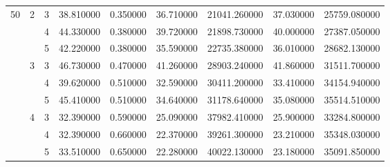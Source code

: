 \begin{tabular}{lllrrrrrr}
\cline{1-9} \cline{2-9}
\multirow[t]{9}{*}{50} & \multirow[t]{3}{*}{2} & 3 & 38.810000 & 0.350000 & 36.710000 & 21041.260000 & 37.030000 & 25759.080000 \\
 &  & 4 & 44.330000 & 0.380000 & 39.720000 & 21898.730000 & 40.000000 & 27387.050000 \\
 &  & 5 & 42.220000 & 0.380000 & 35.590000 & 22735.380000 & 36.010000 & 28682.130000 \\
\cline{2-9}
 & \multirow[t]{3}{*}{3} & 3 & 46.730000 & 0.470000 & 41.260000 & 28903.240000 & 41.860000 & 31511.700000 \\
 &  & 4 & 39.620000 & 0.510000 & 32.590000 & 30411.200000 & 33.410000 & 34154.940000 \\
 &  & 5 & 45.410000 & 0.510000 & 34.640000 & 31178.640000 & 35.080000 & 35514.510000 \\
\cline{2-9}
 & \multirow[t]{3}{*}{4} & 3 & 32.390000 & 0.590000 & 25.090000 & 37982.410000 & 25.900000 & 33284.800000 \\
 &  & 4 & 32.390000 & 0.660000 & 22.370000 & 39261.300000 & 23.210000 & 35348.030000 \\
 &  & 5 & 33.510000 & 0.650000 & 22.280000 & 40022.130000 & 23.180000 & 35091.850000 \\
\cline{1-9} \cline{2-9}
\bottomrule
\end{tabular}
